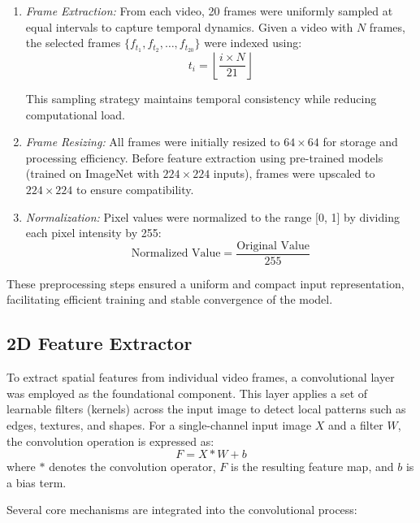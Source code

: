 \documentclass[conference]{IEEEtran}
\begin{document}
\begin{enumerate}
    \item \textit{Frame Extraction:} From each video, 20 frames were uniformly sampled at equal intervals to capture temporal dynamics. Given a video with $N$ frames, the selected frames $\{f_{t_1}, f_{t_2}, \dots, f_{t_{20}}\}$ were indexed using:
\begin{equation}
t_i = \left\lfloor \frac{i \times N}{21} \right\rfloor
\end{equation}

This sampling strategy maintains temporal consistency while reducing computational load.
    \item \textit{Frame Resizing:} All frames were initially resized to $64 \times 64$ for storage and processing efficiency. Before feature extraction using pre-trained models (trained on ImageNet with $224 \times 224$ inputs), frames were upscaled to $224 \times 224$ to ensure compatibility.
    \item \textit{Normalization:} Pixel values were normalized to the range [0, 1] by dividing each pixel intensity by 255:
    \begin{equation}
    \text{Normalized Value} = \frac{\text{Original Value}}{255}
    \end{equation}
\end{enumerate}

These preprocessing steps ensured a uniform and compact input representation, facilitating efficient training and stable convergence of the model.
\subsection{2D Feature Extractor}

To extract spatial features from individual video frames, a convolutional layer was employed as the foundational component. This layer applies a set of learnable filters (kernels) across the input image to detect local patterns such as edges, textures, and shapes. For a single-channel input image $X$ and a filter $W$, the convolution operation is expressed as:
\begin{equation}
F = X \ast W + b
\end{equation}
where $\ast$ denotes the convolution operator, $F$ is the resulting feature map, and $b$ is a bias term.

Several core mechanisms are integrated into the convolutional process:
\end{document}
